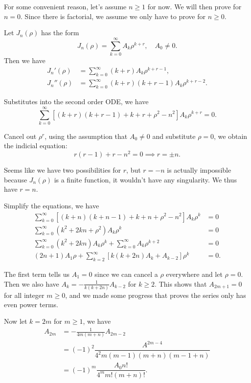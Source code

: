 \documentclass{article}
\begin{document}
\begin{enumerate}
\begin{enumerate}[(a)]
\begin{solution}
            For some convenient reason, let's assume $n\geq 1$ for now. We will then prove for $n=0$. Since there is factorial, we assume 
            we only have to prove for $n\geq 0$. 

            Let $J_n(\rho)$ has the form
            $$J_n(\rho) = \sum_{k=0}^\infty A_k\rho^{k+r}, \quad A_0\neq 0.$$
            Then we have 
            \begin{align*}
                J_n'(\rho) &= \sum_{k=0}^\infty (k+r)A_k \rho^{k+r-1}, \\
                J_n''(\rho) &= \sum_{k=0}^\infty (k+r)(k+r-1) A_k \rho^{k+r-2}.
            \end{align*}

            Substitutes into the second order ODE, we have 
            $$\sum_{k=0}^\infty [(k+r)(k+r-1) + k+r+\rho^2-n^2]A_k\rho^{k+r} = 0.$$

            Cancel out $\rho^r$, using the assumption that $A_0\neq 0$ and substitute $\rho=0$, we obtain the indicial equation: 
            $$r(r-1)+r-n^2=0 \implies r=\pm n.$$

            Seems like we have two possibilities for $r$, but $r=-n$ is actually impossible because $J_n(\rho)$ is a finite function, 
            it wouldn't have any singularity. 
            We thus have $r=n$. 

            Simplify the equations, we have 
            \begin{align*}
                \sum_{k=0}^\infty [(k+n)(k+n-1) + k+n+\rho^2-n^2] A_k \rho^k &= 0\\
                \sum_{k=0}^\infty (k^2+2kn+\rho^2) A_k\rho^k&=0 \\
                \sum_{k=0}^\infty (k^2+2kn)A_k\rho^k + \sum_{k=0}^\infty A_k\rho^{k+2} &= 0\\
                (2n+1)A_1 \rho + \sum_{k=2}^\infty [k(k+2n) A_k + A_{k-2}] \rho^k&=0.
            \end{align*}

            The first term tells us $A_1=0$ since we can cancel a $\rho$ everywhere and let $\rho=0$.
            Then we also have $A_k = -\frac1{k(k+2n)} A_{k-2} $ for $k\geq 2$. 
            This shows that $A_{2m+1}=0$ for all integer $m\geq 0$, and we made some progress that proves the series only has 
            even power terms.
            
            Now let $k=2m$ for $m\geq 1$, we have 
            \begin{align*}
                A_{2m} &= -\frac1{4m(m+n)} A_{2m-2}  \\
                &= (-1)^2 \dfrac{A^{2m-4}}{4^2 m(m-1)(m+n)(m-1+n)} \\
                &= (-1)^m \dfrac{A_0 n!}{4^mm!(m+n)!}.
            \end{align*}


\end{solution}
\end{enumerate}
\end{enumerate}
\end{document}
